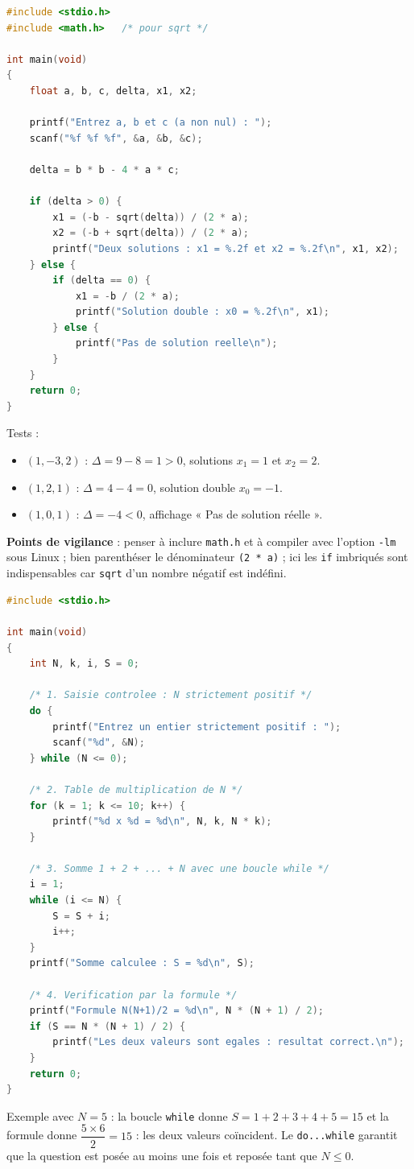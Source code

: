 \documentclass[11pt]{article}
\begin{document}
\begin{corrige}
\begin{lstlisting}[language=C]
#include <stdio.h>
#include <math.h>   /* pour sqrt */

int main(void)
{
    float a, b, c, delta, x1, x2;

    printf("Entrez a, b et c (a non nul) : ");
    scanf("%f %f %f", &a, &b, &c);

    delta = b * b - 4 * a * c;

    if (delta > 0) {
        x1 = (-b - sqrt(delta)) / (2 * a);
        x2 = (-b + sqrt(delta)) / (2 * a);
        printf("Deux solutions : x1 = %.2f et x2 = %.2f\n", x1, x2);
    } else {
        if (delta == 0) {
            x1 = -b / (2 * a);
            printf("Solution double : x0 = %.2f\n", x1);
        } else {
            printf("Pas de solution reelle\n");
        }
    }
    return 0;
}
\end{lstlisting}
Tests :
\begin{itemize}
\item $(1, -3, 2)$ : $\Delta = 9 - 8 = 1 > 0$, solutions $x_1 = 1$ et $x_2 = 2$.
\item $(1, 2, 1)$ : $\Delta = 4 - 4 = 0$, solution double $x_0 = -1$.
\item $(1, 0, 1)$ : $\Delta = -4 < 0$, affichage « Pas de solution réelle ».
\end{itemize}
\textbf{Points de vigilance} : penser à inclure \texttt{math.h} et à compiler avec l'option \texttt{-lm} sous Linux ; bien parenthéser le dénominateur \texttt{(2 * a)} ; ici les \texttt{if} imbriqués sont indispensables car \texttt{sqrt} d'un nombre négatif est indéfini.
\end{corrige}

\begin{corrige}
\begin{lstlisting}[language=C]
#include <stdio.h>

int main(void)
{
    int N, k, i, S = 0;

    /* 1. Saisie controlee : N strictement positif */
    do {
        printf("Entrez un entier strictement positif : ");
        scanf("%d", &N);
    } while (N <= 0);

    /* 2. Table de multiplication de N */
    for (k = 1; k <= 10; k++) {
        printf("%d x %d = %d\n", N, k, N * k);
    }

    /* 3. Somme 1 + 2 + ... + N avec une boucle while */
    i = 1;
    while (i <= N) {
        S = S + i;
        i++;
    }
    printf("Somme calculee : S = %d\n", S);

    /* 4. Verification par la formule */
    printf("Formule N(N+1)/2 = %d\n", N * (N + 1) / 2);
    if (S == N * (N + 1) / 2) {
        printf("Les deux valeurs sont egales : resultat correct.\n");
    }
    return 0;
}
\end{lstlisting}
Exemple avec $N = 5$ : la boucle \texttt{while} donne $S = 1+2+3+4+5 = 15$ et la formule donne $\dfrac{5 \times 6}{2} = 15$ : les deux valeurs coïncident. Le \texttt{do...while} garantit que la question est posée au moins une fois et reposée tant que $N \leq 0$.
\end{corrige}
\end{document}
